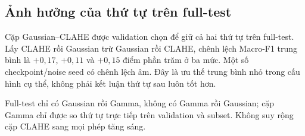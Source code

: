 \subsection{Ảnh hưởng của thứ tự trên full-test}
Cặp Gaussian--CLAHE được validation chọn để giữ cả hai thứ tự trên full-test. Lấy CLAHE rồi Gaussian trừ Gaussian rồi CLAHE, chênh lệch Macro-F1 trung bình là $+0,17$, $+0,11$ và $+0,15$ điểm phần trăm ở ba mức. Một số checkpoint/noise seed có chênh lệch âm. Đây là ưu thế trung bình nhỏ trong cấu hình cụ thể, không phải kết luận thứ tự sau luôn tốt hơn.

Full-test chỉ có Gaussian rồi Gamma, không có Gamma rồi Gaussian; cặp Gamma chỉ được so thứ tự trực tiếp trên validation và subset. Không suy rộng cặp CLAHE sang mọi phép tăng sáng.
